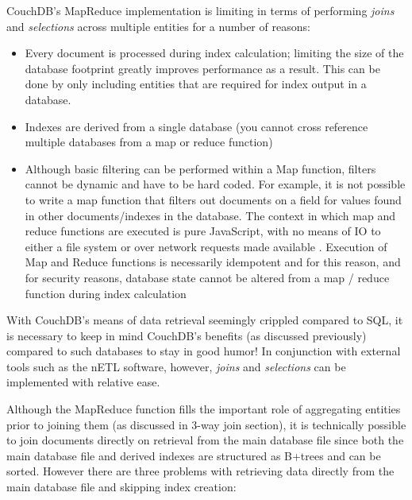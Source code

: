 \label{chapter-analysis}
CouchDB's MapReduce implementation is limiting in terms of performing \textit{joins} and \textit{selections} across multiple entities for a number of reasons:

\begin{itemize}
    \item Every document is processed during index calculation; limiting the size of the database footprint greatly improves performance as a result. This can be done by only including entities that are required for index output in a database.
    \item Indexes are derived from a single database (you cannot cross reference multiple databases from a map or reduce function)
    \item Although basic filtering can be performed within a Map function, filters cannot be dynamic and have to be hard coded. For example, it is not possible to write a map function that filters out documents on a field for values found in other documents/indexes in the database. The context in which map and reduce functions are executed is pure JavaScript, with no means of IO to either a file system or over network requests made available \cite{slack28Feb}. Execution of Map and Reduce functions is necessarily idempotent and for this reason, and for security reasons, database state cannot be altered from a map / reduce function during index calculation
\end{itemize}

With CouchDB's means of data retrieval seemingly crippled compared to SQL, it is necessary to keep in mind CouchDB's benefits (as discussed previously) compared to such databases to stay in good humor! In conjunction with external tools such as the nETL software, however, \textit{joins} and \textit{selections} can be implemented with relative ease.

Although the MapReduce function fills the important role of aggregating entities prior to joining them (as discussed in 3-way join section), it is technically possible to join documents directly on retrieval from the main database file since both the main database file and derived indexes are structured as B+trees and can be sorted. However there are three problems with retrieving data directly from the main database file and skipping index creation:


